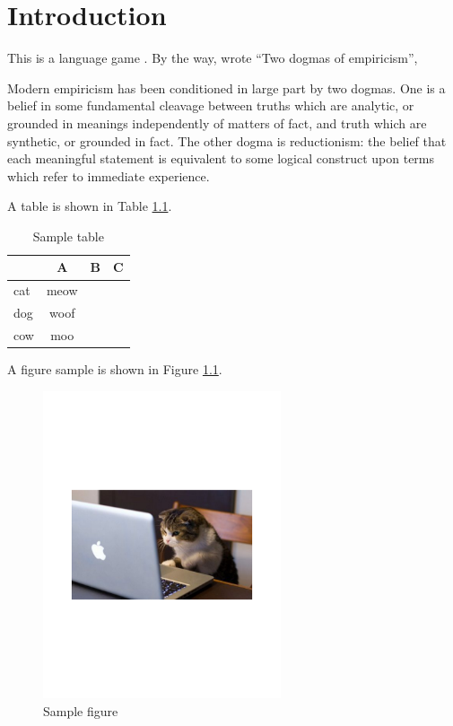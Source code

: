 \chapter{Introduction}
\label{chap:intro}

This is a language game \cite{wittgenstein1953philosophical}.
By the way,  wrote ``Two dogmas of empiricism'',
\begin{displayquote}
  Modern empiricism has been conditioned in large part by two
  dogmas. One is a belief in some fundamental cleavage between
  truths which are analytic, or grounded in meanings independently of
  matters of fact, and truth which are synthetic, or grounded in fact.
  The other dogma is reductionism: the belief that each meaningful
  statement is equivalent to some logical construct upon terms which
  refer to immediate experience.
\end{displayquote}


A table is shown in Table \ref{tab:sample}.
\blindtext[3]

\begin{table}[t]
  \small
  \centering
  \begin{tabular}{l|c|c|c} \hline
       & A     & B & C \\ \hline\hline
  cat  & meow  &   &   \\
  dog  & woof  &   &   \\
  cow  & moo   &   &   \\ \hline
  \end{tabular}
  \caption{Sample table}
  \label{tab:sample}
\end{table}

\blindtext[2]
A figure sample is shown in Figure \ref{fig:sample}.

\begin{figure}[t]
  \centering
  \includegraphics[width=70mm]{fig/sample_figure.pdf}
  \caption{Sample figure}
  \label{fig:sample}
\end{figure}


\blindtext[3]

